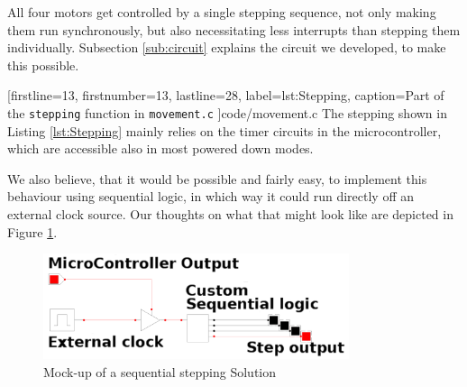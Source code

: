 All four motors get controlled by a single stepping sequence,
not only making them run synchronously,
but also necessitating less interrupts than stepping them individually.
Subsection \ref{sub:circuit} explains the circuit we developed,
to make this possible.


[firstline=13,				%
firstnumber=13,
lastline=28,
label=lst:Stepping,	%
caption={Part of the {\tt stepping} function in {\tt movement.c}}
]{code/movement.c}
%
The stepping shown in Listing \ref{lst:Stepping} mainly relies on the timer circuits in the microcontroller,
which are accessible also in most powered down modes.

We also believe, that it would be possible and fairly easy,
to implement this behaviour using sequential logic,
in which way it could run directly off an external clock source.
Our thoughts on what that might look like are depicted in Figure \ref{fig:sequential}.

\begin{figure}[hp]
	\centering
	\includegraphics[width=0.8\textwidth]{figures/move/sequential_logic}
	\caption{Mock-up of a sequential stepping Solution}
	\label{fig:sequential}
\end{figure}
%